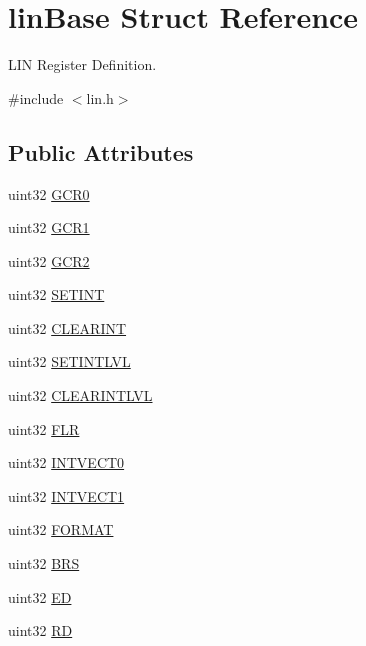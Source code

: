 \hypertarget{structlinBase}{}\section{lin\+Base Struct Reference}
\label{structlinBase}


L\+IN Register Definition.  




{\ttfamily \#include $<$lin.\+h$>$}

\subsection*{Public Attributes}
\begin{DoxyCompactItemize}
\item 
uint32 \mbox{\hyperlink{structlinBase_a1d322e930c882cb11e5f68b630c9777e}{G\+C\+R0}}
\item 
uint32 \mbox{\hyperlink{structlinBase_a17ba37142670bab5388a4e9710aeb0cc}{G\+C\+R1}}
\item 
uint32 \mbox{\hyperlink{structlinBase_a91b69bb454fbdfc4d4b91e08f81c6349}{G\+C\+R2}}
\item 
uint32 \mbox{\hyperlink{structlinBase_a993fe9dfb30e8c0b30778c1713a0fdc2}{S\+E\+T\+I\+NT}}
\item 
uint32 \mbox{\hyperlink{structlinBase_a7b4cd525abb10f6a3c426bfc217b8b21}{C\+L\+E\+A\+R\+I\+NT}}
\item 
uint32 \mbox{\hyperlink{structlinBase_ae04c1d83e00528417ca3175a224b684e}{S\+E\+T\+I\+N\+T\+L\+VL}}
\item 
uint32 \mbox{\hyperlink{structlinBase_ab06a9ea5f7853f5c0581da7e52c7daa9}{C\+L\+E\+A\+R\+I\+N\+T\+L\+VL}}
\item 
uint32 \mbox{\hyperlink{structlinBase_a264cdfce40f6301ce574807f9e88a292}{F\+LR}}
\item 
uint32 \mbox{\hyperlink{structlinBase_a1029deea979390be9087f8d8727f0d96}{I\+N\+T\+V\+E\+C\+T0}}
\item 
uint32 \mbox{\hyperlink{structlinBase_ad576fdd8dc5d3d7ade8c021b3e747127}{I\+N\+T\+V\+E\+C\+T1}}
\item 
uint32 \mbox{\hyperlink{structlinBase_a6d6aa6d9229d3160be445f73feb4b791}{F\+O\+R\+M\+AT}}
\item 
uint32 \mbox{\hyperlink{structlinBase_a88001d21796a358d8bec76c3e5e78bb4}{B\+RS}}
\item 
uint32 \mbox{\hyperlink{structlinBase_a63f86b1e8a5bedc909a1cb67f11201bc}{ED}}
\item 
uint32 \mbox{\hyperlink{structlinBase_a9620ca11199c24ff55f8af7fd100f1a7}{RD}}

\end{DoxyCompactItemize}
